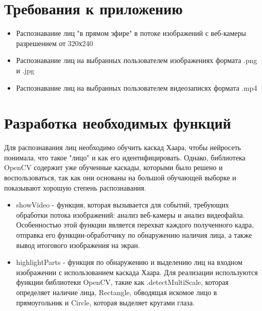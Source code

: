 \documentclass[a4paper,12pt]{article}
\begin{document}
%

%
\newpage

\section{Требования к приложению}

\begin{itemize}
\item Распознавание лиц "в прямом эфире" в потоке изображений с веб-камеры разрешением от 320х240
\item Распознавание лиц на выбранных пользователем изображениях формата .png и .jpg
\item Распознавание лиц на выбранных пользователем видеозаписях формата .mp4
\end{itemize}

\newpage

\section{Разработка необходимых функций}

Для распознавания лиц необходимо обучить каскад Хаара, чтобы нейросеть понимала, что такое "лицо" и как его идентифицировать. Однако, библиотека OpenCV содержит уже обученные каскады, которыми было решено и воспользоваться, так как они основаны на большой обучающей выборке и показывают хорошую степень распознавания. \\

\begin{itemize}
\item showVideo - функция, которая вызывается для событий, требующих обработки потока изображений: анализ веб-камеры и анализ видеофайла. Особенностью этой функции является перехват каждого полученного кадра, отправка его функции-обработчику по обнаружению наличия лица, а также вывод итогового изображения на экран.
\item highlightParts - функция по обнаружению и выделению лиц на входном изображении с использованием каскада Хаара. Для реализации используются функции библиотеки OpenCV, такие как .detectMultiScale, которая определяет наличие лица, Rectangle, обводящая искомое лицо в прямоугольник и Circle, которая выделяет кругами глаза.
\end{itemize}
\end{document}
